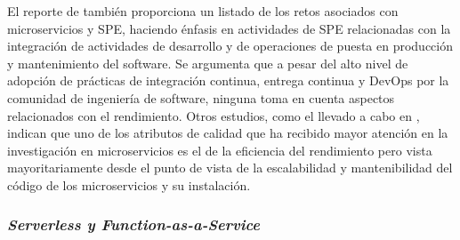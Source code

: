El reporte de \cite{DBLP:journals/corr/BrunnertHWDHHHJ15} también proporciona un listado de los retos asociados con microservicios y SPE, haciendo énfasis en actividades de SPE relacionadas con la integración de actividades de desarrollo y de operaciones de puesta en producción y mantenimiento del software. Se argumenta que a pesar del alto nivel de adopción de prácticas de integración continua, entrega continua y DevOps por la comunidad de ingeniería de software, ninguna toma en cuenta aspectos relacionados con el rendimiento. Otros estudios, como el llevado a cabo en \cite{7930195}, indican que uno de los atributos de calidad que ha recibido mayor atención en la investigación en microservicios es el de la eficiencia del rendimiento pero vista mayoritariamente desde el punto de vista de la escalabilidad y mantenibilidad del código de los microservicios y su instalación.



\subsubsection{\emph{Serverless y Function-as-a-Service}}
%
%

